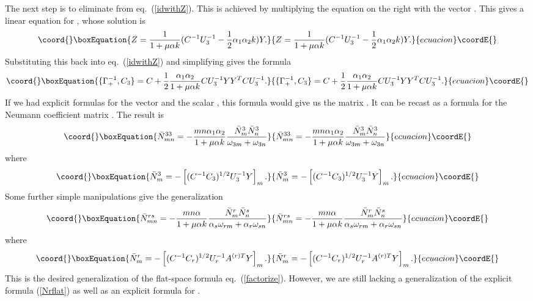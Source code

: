 \documentclass[a4paper,12pt]{article}
\begin{document}
The next step is to eliminate \coordHE{} from eq.~(\ref{idwithZ}). This
is achieved by multiplying the equation on the right with the
vector \coordHE{}. This gives a linear equation for \coordHE{}, whose solution
is
\begin{equation}\coord{}\boxEquation{
Z = {1\over 1 + \mu \alpha k}(C^{-1} U_3^{-1} - {1\over 2}
\alpha_1 \alpha_2 k)  Y.
}{
Z = {1\over 1 + \mu \alpha k}(C^{-1} U_3^{-1} - {1\over 2}
\alpha_1 \alpha_2 k)  Y.
}{ecuacion}\coordE{}\end{equation}
Substituting this back into eq.~(\ref{idwithZ}) and simplifying
gives the formula
\begin{equation}\coord{}\boxEquation{ \label{symformula}
\{ \Gamma_+^{-1} , C_3\} = C + {1\over2} {\alpha_1 \alpha_2 \over
1 + \mu \alpha k} C U_3^{-1} Y Y^T CU_3^{-1}.
}{ \{ \Gamma_+^{-1} , C_3\} = C + {1\over2} {\alpha_1 \alpha_2 \over
1 + \mu \alpha k} C U_3^{-1} Y Y^T CU_3^{-1}.
}{ecuacion}\coordE{}\end{equation}
If we had explicit formulas for the vector \coordHE{} and the scalar \coordHE{},
this formula would give us the matrix \coordHE{}. It can be
recast as a formula for the Neumann coefficient matrix \coordHE{}. The result is
\begin{equation}\coord{}\boxEquation{
\bar N^{33}_{mn} = - {mn\alpha_1 \alpha_2 \over 1 + \mu \alpha k}
{\bar N_m^3 \bar N_n^3 \over \omega_{3m} + \omega_{3n}}
}{
\bar N^{33}_{mn} = - {mn\alpha_1 \alpha_2 \over 1 + \mu \alpha k}
{\bar N_m^3 \bar N_n^3 \over \omega_{3m} + \omega_{3n}}
}{ecuacion}\coordE{}\end{equation}
where
\begin{equation}\coord{}\boxEquation{
\bar N_m^3 = -\left[ (C^{-1}C_3)^{1/2} U_3^{-1} Y\right]_m.
}{
\bar N_m^3 = -\left[ (C^{-1}C_3)^{1/2} U_3^{-1} Y\right]_m.
}{ecuacion}\coordE{}\end{equation}
Some further simple manipulations give the generalization
\begin{equation}\coord{}\boxEquation{
\bar N^{rs}_{mn} = - {mn\alpha \over 1 + \mu \alpha k} {\bar N_m^r
\bar N_n^s \over \alpha_s\omega_{rm} + \alpha_r\omega_{sn}}
}{
\bar N^{rs}_{mn} = - {mn\alpha \over 1 + \mu \alpha k} {\bar N_m^r
\bar N_n^s \over \alpha_s\omega_{rm} + \alpha_r\omega_{sn}}
}{ecuacion}\coordE{}\end{equation}
where
\begin{equation}\coord{}\boxEquation{
\bar N_m^r = -\left[ (C^{-1}C_r)^{1/2} U_r^{-1} A^{(r)T}
Y\right]_m.
}{
\bar N_m^r = -\left[ (C^{-1}C_r)^{1/2} U_r^{-1} A^{(r)T}
Y\right]_m.
}{ecuacion}\coordE{}\end{equation}
This is the desired generalization of the flat-space formula
eq.~(\ref{factorize}). However, we are still lacking a
generalization of the explicit formula (\ref{Nrflat}) as well as
an explicit formula for \coordHE{}.
\end{document}
